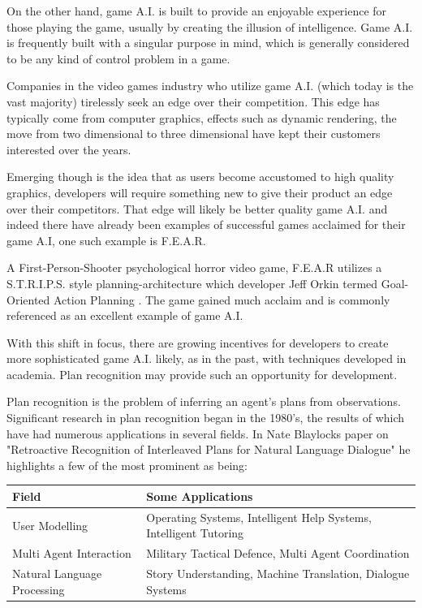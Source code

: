 \documentclass[parskip]{cs4rep}
\begin{document}
On the other hand, game A.I. is built to provide an enjoyable experience for those playing the game, usually by creating the illusion of intelligence. Game A.I. is frequently built with a singular purpose in mind, which is generally considered to be any kind of control problem in a game.

Companies in the video games industry who utilize game A.I. (which today is the vast majority) tirelessly seek an edge over their competition. This edge has typically come from computer graphics, effects such as dynamic rendering, the move from two dimensional to three dimensional have kept their customers interested over the years. 

Emerging though is the idea that as users become accustomed to high quality graphics, developers will require something new to give their product an edge over their competitors. That edge will likely be better quality game A.I. and indeed there have already been examples of successful games acclaimed for their game A.I, one such example is F.E.A.R. 

A First-Person-Shooter psychological horror video game, F.E.A.R utilizes a S.T.R.I.P.S. style planning-architecture which developer Jeff Orkin termed Goal-Oriented Action Planning \cite{citeulike:5386647}. The game gained much acclaim and is commonly referenced as an excellent example of game A.I.

With this shift in focus, there are growing incentives for developers to create more sophisticated game A.I. likely, as in the past, with techniques developed in academia. Plan recognition may provide such an opportunity for development. 

Plan recognition is the problem of inferring an agent's plans from observations. Significant research in plan recognition began in the 1980's, the results of which have had numerous applications in several fields. In Nate Blaylocks paper on "Retroactive Recognition of Interleaved Plans for Natural Language Dialogue" \cite{oai:CiteSeerPSU:538953} he highlights a few of the most prominent as being:

\begin{tabular}{|l|p{8cm}|}
\hline 
\textbf{Field} & \textbf{Some Applications} \\ 
\hline 
User Modelling & Operating Systems, Intelligent Help Systems, Intelligent Tutoring \\ 
\hline 
Multi Agent Interaction & Military Tactical Defence, Multi Agent Coordination \\ 
\hline 
Natural Language Processing & Story Understanding, Machine Translation, Dialogue Systems \\ 
\hline
\end{tabular} 
\end{document}
